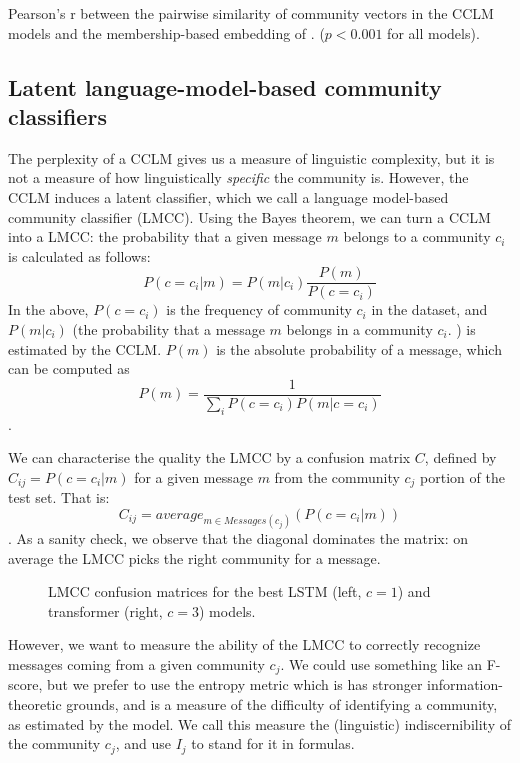 \documentclass[11pt,a4paper]{article}
\newcommand\Ind{I}
\begin{document}
\begin{table}
  \centering
  
  \caption{Pearson's r between the pairwise similarity of community vectors
  in the CCLM models and the membership-based embedding of \citet{Kumar2018}.
  ($p<0.001$ for all models).
  }
  \label{tab:pairwise-comm-sim}
\end{table}

\subsection{Latent language-model-based community classifiers}

The perplexity of a CCLM gives us a measure of linguistic complexity,
but it is not a measure of how linguistically \emph{specific} the
community is. However, the CCLM induces a latent classifier,
which we call a language model-based community classifier
(LMCC). Using the Bayes theorem, we can turn a
CCLM into a LMCC: the probability that a given message $m$
belongs to a community $c_i$ is calculated as follows:
\[P(c=c_i | m) = P(m | c_i)\frac {P(m)} {P(c=c_i)}\]
In the above,
$P(c=c_i)$ is the frequency of community $c_i$ in the dataset, and
$P(m | c_i)$ (the probability that a message $m$
belongs in a community $c_i$. ) is estimated by the CCLM. $P(m)$ is the absolute
probability of a message, which can be computed as
\[P(m) = \frac 1 {\sum_i P(c=c_i) P(m|c=c_i ) }\].

We can characterise the quality the LMCC by a confusion matrix
$C$, defined by $C_{ij} = P(c=c_i | m)$ for a given message $m$ 
from the community $c_j$ portion of the test set.  That is:
\[C_{ij} = average_{m \in Messages(c_j)}(P(c=c_i | m))\].
As a sanity check, we observe that the diagonal dominates the matrix: on average the LMCC picks the right community for a message.

\begin{figure*}
\caption{LMCC confusion matrices for the best LSTM (left, $c=1$) and transformer (right, $c=3$) models.}
\label{fig:confusion}
\end{figure*}

However, we want to measure the ability of the LMCC to correctly
recognize messages coming from a given community $c_j$. We could use
something like an F-score, but we prefer to use the entropy metric
which is has stronger information-theoretic grounds, and is a measure
of the difficulty of identifying a community, as estimated by the
model. We call this measure the (linguistic) indiscernibility of the
community $c_j$, and use \(\Ind_j\) to stand for it in formulas.
\end{document}
